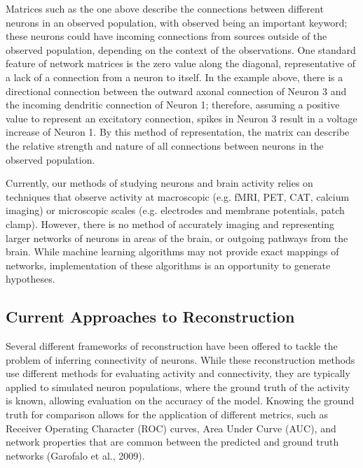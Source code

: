 \documentclass[11pt]{article}
\begin{document}
Matrices such as the one above describe the connections between different neurons in an observed population, with observed being an important keyword; these neurons could have incoming connections from sources outside of the observed population, depending on the context of the observations. One standard feature of network matrices is the zero value along the diagonal, representative of a lack of a connection from a neuron to itself. In the example above, there is a directional connection between the outward axonal connection of Neuron 3 and the incoming dendritic connection of Neuron 1; therefore, assuming a positive value to represent an excitatory connection, spikes in Neuron 3 result in a voltage increase of Neuron 1. By this method of representation, the matrix can describe the relative strength and nature of all connections between neurons in the observed population.\par

Currently, our methods of studying neurons and brain activity relies on techniques that observe activity at macroscopic (e.g. fMRI, PET, CAT, calcium imaging) or microscopic scales (e.g. electrodes and membrane potentials, patch clamp). However, there is no method of accurately imaging and representing larger networks of neurons in areas of the brain, or outgoing pathways from the brain. While machine learning algorithms may not provide exact mappings of networks, implementation of these algorithms is an opportunity to generate hypotheses.\par

\subsection{Current Approaches to Reconstruction}
Several different frameworks of reconstruction have been offered to tackle the problem of inferring connectivity of neurons. While these reconstruction methods use different methods for evaluating activity and connectivity, they are typically applied to simulated neuron populations, where the ground truth of the activity is known, allowing evaluation on the accuracy of the model. Knowing the ground truth for comparison allows for the application of different metrics, such as Receiver Operating Character (ROC) curves, Area Under Curve (AUC), and network properties that are common between the predicted and ground truth networks (Garofalo et al., 2009).\par
\end{document}
